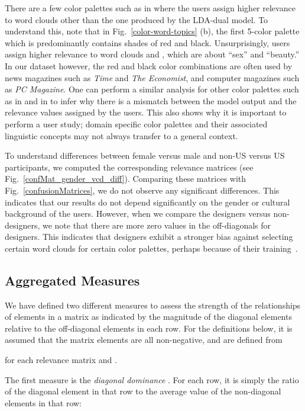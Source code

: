 \documentclass[prodmode,acmtochi]{acmsmall}
\begin{document}
There are a few color palettes such as  in  where the
users assign higher relevance to word clouds other than the one produced
by the LDA-dual model. To understand this, note that in
Fig.~\ref{color-word-topics} (b), the first 5-color palette which is
 predominantly contains shades of red and black. Unsurprisingly,
users assign higher relevance to word clouds  and , which are
about ``sex'' and ``beauty.''  In our dataset however, the red and
black color combinations are often used by news magazines such as \emph{Time}
and \emph{The Economist}, and computer magazines such as \emph{PC Magazine}. One can
perform a similar analysis for other color palettes such as  in
 and  in  to infer why there is a mismatch between
the model output and the relevance values assigned by the users. This
also shows why it is important to perform a user study; domain specific
color palettes and their associated linguistic concepts may not always
transfer to a general context.

To understand differences between female versus male and non-US versus US
participants, we computed the corresponding relevance matrices (see Fig.~\ref{confMat_gender_vcd_diff}).
Comparing these matrices with Fig.~\ref{confusionMatrices}, we do not observe any
significant differences. This indicates that our results do not depend
significantly on the gender or cultural background of the
users. However, when we compare the designers versus non-designers, we note that there
are more zero values in the off-diagonals for designers. This indicates
that designers exhibit a stronger bias against selecting certain word
clouds for certain color palettes, perhaps because of their training~\cite{whitfield1982design}.

\subsection{Aggregated Measures}

We have defined two different measures to assess the strength of the relationships of elements in a matrix as indicated by the magnitude of the diagonal elements relative to the off-diagonal elements in each row. For the definitions below, it is assumed that the matrix elements are all non-negative, and are defined from

for each relevance matrix  and .

The first measure is the \emph{diagonal dominance} . For each row, it is simply the ratio of the diagonal element in that row to the average value of the non-diagonal elements in that row:
\end{document}
